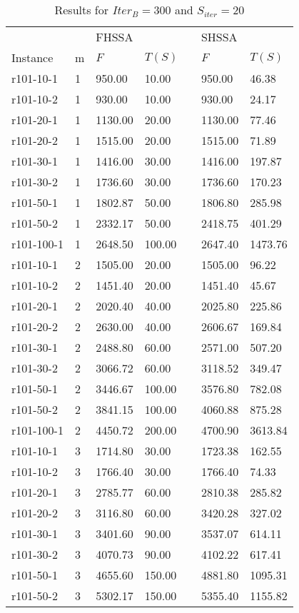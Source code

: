 \documentclass[final,5p,times,twocolumn]{elsarticle}
\begin{document}
{{{{{{{{{{{{\renewcommand{\arraystretch}{1.2}
\begin{table}[htbp]
\centering
\caption{Results for $Iter_{B}=300$ and $S_{iter}=20$}
\centering
\begin{tabular}{l l l l l l l}
\hline 
&&\multicolumn{2}{l}{FHSSA}&& \multicolumn{2}{l}{SHSSA}\\
\cline{3-4}\cline{6-7}
Instance & m & $F$ & $T(S)$ && $F$ & $T(S)$\\
\hline
r101-10-1&1&950.00&10.00&&950.00&46.38\\
r101-10-2&1&930.00&10.00&&930.00&24.17\\
r101-20-1&1&1130.00&20.00&&1130.00&77.46\\
r101-20-2&1&1515.00&20.00&&1515.00&71.89\\
r101-30-1&1&1416.00&30.00&&1416.00&197.87\\
r101-30-2&1&1736.60&30.00&&1736.60&170.23\\
r101-50-1&1&1802.87&50.00&&1806.80&285.98\\
r101-50-2&1&2332.17&50.00&&2418.75&401.29\\
r101-100-1&1&2648.50&100.00&&2647.40&1473.76\\
r101-10-1&2&1505.00&20.00&&1505.00&96.22\\
r101-10-2&2&1451.40&20.00&&1451.40&45.67\\
r101-20-1&2&2020.40&40.00&&2025.80&225.86\\
r101-20-2&2&2630.00&40.00&&2606.67&169.84\\
r101-30-1&2&2488.80&60.00&&2571.00&507.20\\
r101-30-2&2&3066.72&60.00&&3118.52&349.47\\
r101-50-1&2&3446.67&100.00&&3576.80&782.08\\
r101-50-2&2&3841.15&100.00&&4060.88&875.28\\
r101-100-1&2&4450.72&200.00&&4700.90&3613.84\\
r101-10-1&3&1714.80&30.00&&1723.38&162.55\\
r101-10-2&3&1766.40&30.00&&1766.40&74.33\\
r101-20-1&3&2785.77&60.00&&2810.38&285.82\\
r101-20-2&3&3116.80&60.00&&3420.28&327.02\\
r101-30-1&3&3401.60&90.00&&3537.07&614.11\\
r101-30-2&3&4070.73&90.00&&4102.22&617.41\\
r101-50-1&3&4655.60&150.00&&4881.80&1095.31\\
r101-50-2&3&5302.17&150.00&&5355.40&1155.82\\

\end{tabular}
\end{table}}}}}}}}}}}}}
\end{document}
